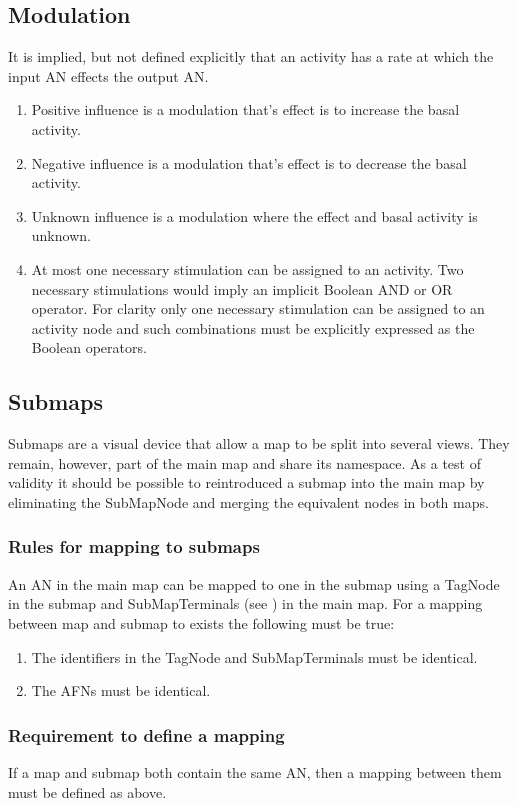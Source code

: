 \subsection{Modulation}

It is implied, but not defined explicitly that an activity has a rate at which the input AN effects the output AN. 

\begin{enumerate}
\item Positive influence is a modulation that's effect is to increase the basal activity.
\item Negative influence is a modulation that's effect is to decrease the basal activity.
\item Unknown influence is a modulation where the effect and basal activity is unknown.
\item At most one necessary stimulation can be assigned to an activity. Two necessary stimulations
  would imply an implicit Boolean AND or OR operator. For clarity only
  one necessary stimulation can be assigned to an activity node and such combinations must be
  explicitly expressed as the Boolean operators.
\end{enumerate}

\subsection{Submaps}

Submaps are a visual device that allow a map to be split into several views. They remain, however, part of the main map and share its
namespace. As a test of validity it should be possible to reintroduced a submap into the main map by eliminating the SubMapNode and merging
the equivalent nodes in both maps.

\subsubsection{Rules for mapping to submaps}

An AN in the main map can be mapped to one in the submap using a TagNode in the submap and SubMapTerminals (see ) in the main map. For a
mapping between map and submap to exists the following must be true:

\begin{enumerate}
\item The identifiers in the TagNode and SubMapTerminals must be identical.
\item The AFNs must be identical.
\end{enumerate}

\subsubsection{Requirement to define a mapping}

If a map and submap both contain the same AN, then a mapping between them must be defined as above.